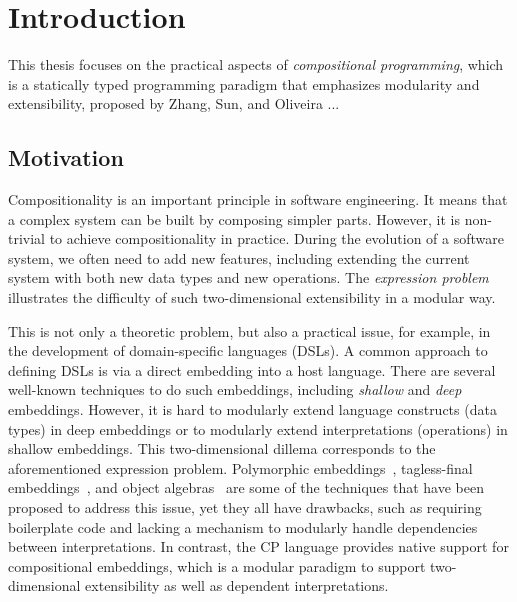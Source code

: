 \chapter{Introduction} \label{ch:introduction}

This thesis focuses on the practical aspects of \emph{compositional
programming}, which is a statically typed programming paradigm that emphasizes
modularity and extensibility, proposed by Zhang, Sun, and Oliveira
\citeyearpar{zhang2021compositional}...

\section{Motivation}

Compositionality is an important principle in software engineering. It means
that a complex system can be built by composing simpler parts. However, it is
non-trivial to achieve compositionality in practice. During the evolution of a
software system, we often need to add new features, including extending the
current system with both new data types and new operations. The \emph{expression
problem}~\citep{wadler1998expression} illustrates the difficulty of such
two-dimensional extensibility in a modular way.

This is not only a theoretic problem, but also a practical issue, for example,
in the development of domain-specific languages (DSLs). A common approach to
defining DSLs is via a direct embedding into a host language. There are several
well-known techniques to do such embeddings, including \emph{shallow} and
\emph{deep} embeddings. However, it is hard to modularly extend language
constructs (data types) in deep embeddings or to modularly extend
interpretations (operations) in shallow embeddings. This two-dimensional dillema
corresponds to the aforementioned expression problem. Polymorphic
embeddings~\citep{hofer2008polymorphic}, tagless-final
embeddings~\citep{carette2009finally}, and object
algebras~\citep{oliveira2012extensibility} are some of the techniques that have
been proposed to address this issue, yet they all have drawbacks, such as
requiring boilerplate code and lacking a mechanism to modularly handle
dependencies between interpretations. In contrast, the CP language provides
native support for compositional embeddings, which is a modular paradigm to
support two-dimensional extensibility as well as dependent interpretations.

